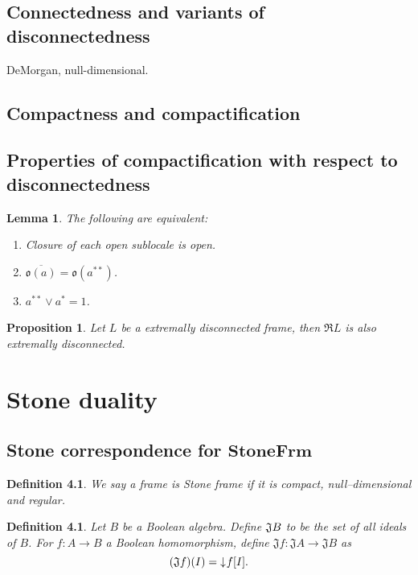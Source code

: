 \documentclass[12pt,a4paper,fleqn]{report}
\makeatletter
\newcounter{thmCounter}[section]
\theoremstyle{newthmstyle}
\newtheorem{lemma}[thmCounter]{Lemma}
\newtheorem{proposition}[thmCounter]{Proposition}
\theoremstyle{newthmstyleNormal}
\newtheorem{definition}[thmCounter]{Definition}
\newcommand\categoryStyle[1]{\ensuremath{\mathbf{#1}}}
\newcommand\StoneFrm{\categoryStyle{StoneFrm}}
\newcommand\R{\ensuremath{\mathfrak{R}}}
\newcommand\J{\ensuremath{\mathfrak{J}}}
\newcommand\closure[1]{\overline{#1}}
\newcommand\downset{\mathord{\downarrow}\mkern1mu} %
\newcommand\DEF[2][]{\index{#2#1}\emph{#2}}
\newcommand\DEFSYM[2]{\index{#1@#2}\emph{#2}}
\makeatother
\begin{document}
\section{Connectedness and variants of disconnectedness}
DeMorgan, null-dimensional.
\section{Compactness and compactification}
\section{Properties of compactification with respect to disconnectedness}
\begin{lemma}
    The following are equivalent:

    \begin{enumerate}
        \item Closure of each open sublocale is open.
        \item $\closure{\mathfrak{o}(a)} = \mathfrak{o}(a^{**})$.
        \item $a^{**} \vee a^* = 1$.
    \end{enumerate}
\end{lemma}

\begin{proposition}
    Let $L$ be a extremally disconnected frame, then $\R L$ is also extremally disconnected.
\end{proposition}

\chapter{Stone duality}
\section{Stone correspondence for \StoneFrm}
\begin{definition}
    We say a frame is \DEF{Stone frame} if it is compact, null--dimensional and regular.
\end{definition}

\begin{definition}
    Let $B$ be a Boolean algebra. Define $\DEFSYM{J}{\J} B$ to be the set of all ideals of $B$.
    For $f\colon A \to B$ a Boolean homomorphism, define $\J f\colon \J A \to \J B$ as
    $$(\J f)(I) = \downset f[I].$$
\end{definition}
\end{document}

